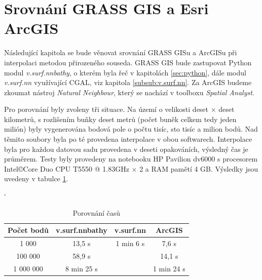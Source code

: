 \documentclass[12pt,a4paper]{article}
\begin{document}
\appendix
\newpage
\section{Srovnání GRASS GIS a Esri ArcGIS}
\label{app:srovnani}

Následující kapitola se bude věnovat srovnání GRASS GISu a ArcGISu při
interpolaci metodou přirozeného souseda. GRASS GIS bude zastupovat
Python modul \emph{v.surf.nnbathy}, o kterém byla řeč v 
kapitolách \ref{sec:python}, dále modul \emph{v.surf.nn} využívající CGAL, viz kapitola \ref{subsub:v.surf.nn}. Za ArcGIS budeme zkoumat nástroj \emph{Natural Neighbour},
který se nachází v toolboxu \emph{Spatial Analyst}.

Pro porovnání byly zvoleny tři situace. Na území o velikosti deset
$\times$ deset kilometrů, s rozlišením buňky deset metrů (počet buněk celkem tedy jeden milión)
byly vygenerována
bodová pole o počtu tisíc, sto tisíc a milion bodů. Nad těmito soubory
byla po té provedena interpolace v obou softwarech. Interpolace byla
pro každou datovou sadu provedena v deseti opakováních, výsledný čas
je průměrem. Testy byly provedeny na notebooku HP Pavilion dv6000 s
procesorem Intel\copyright Core Duo CPU T5550 @
1.83GHz $\times$ 2 a RAM pamětí 4 GB. Výsledky jsou uvedeny v tabulce
\ref{tab:GRASSxArc}.


\bigskip
\begin{table}[h]
\catcode`
\begin{tabular}{|c|c|c|c|}
\hline
Počet bodů & v.surf.nnbathy & v.surf.nn & ArcGIS     \\ \hline
1 000      & 13,5 s         & 1 min 6 s & 7,6 s      \\ \hline
100 000    & 58,9 s         &           & 14,1 s     \\ \hline
1 000 000  & 8 min 25 s     &           & 1 min 24 s \\ \hline
\end{tabular}
\caption{Porovnání časů}
\label{tab:GRASSxArc}
\end{table}
\end{document}
